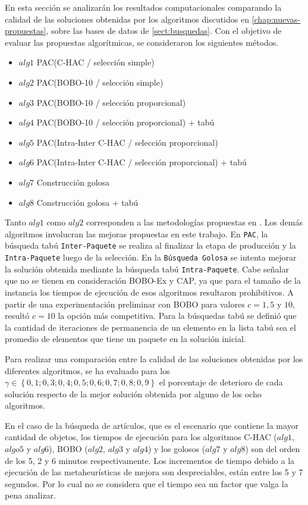 En esta sección se analizarán los resultados computacionales comparando la calidad de las soluciones obtenidas por los algoritmos discutidos en \autoref{chap:nuevas-propuestas}, sobre las bases de datos de \autoref{sect:busquedas}. Con el objetivo de evaluar las propuestas algorítmicas, se consideraron los siguientes métodos.

\begin{itemize}
\item{$alg1$} PAC(C-HAC / selección simple)
\item{$alg2$} PAC(BOBO-10 / selección simple)
\item{$alg3$} PAC(BOBO-10 / selección proporcional)
\item{$alg4$} PAC(BOBO-10 / selección proporcional) + tabú
\item{$alg5$} PAC(Intra-Inter C-HAC / selección proporcional)
\item{$alg6$} PAC(Intra-Inter C-HAC / selección proporcional) + tabú
\item{$alg7$} Construcción golosa
\item{$alg8$} Construcción golosa + tabú
\end{itemize}

Tanto $alg1$ como $alg2$ corresponden a las metodologías propuestas en \cite{journals/tkde/Amer-YahiaBCFMZ14}. Los demás algoritmos involucran las mejoras propuestas en este trabajo. En \texttt{PAC}, la búsqueda tabú \texttt{Inter-Paquete} se realiza al finalizar la etapa de producción y la \texttt{Intra-Paquete} luego de la selección. En la \texttt{Búsqueda Golosa} se intenta mejorar la solución obtenida mediante la búsqueda tabú \texttt{Intra-Paquete}. Cabe señalar que no se tienen en consideración BOBO-Ex y CAP, ya que para el tamaño de la instancia los tiempos de ejecución de esos algoritmos resultaron prohibitivos. A partir de una experimentación preliminar con BOBO para valores $c=1, 5$ y $10$, resultó $c=10$ la opción más competitiva. Para la búsquedas tabú se definió que la cantidad de iteraciones de permanencia de un elemento en la lista tabú sea el promedio de elementos que tiene un paquete en la solución inicial.

Para realizar una comparación entre la calidad de las soluciones obtenidas por los diferentes algoritmos, se ha evaluado para los $\gamma \in \left\{0,1; 0,3; 0,4; 0,5; 0,6; 0,7; 0,8; 0,9\right\}$ el porcentaje de deterioro de cada solución respecto de la mejor solución obtenida por alguno de los ocho algoritmos.

En el caso de la búsqueda de artículos, que es el escenario que contiene la mayor cantidad de objetos, los tiempos de ejecución para los algoritmos C-HAC ($alg1$, $algo5$ y $alg6$), BOBO ($alg2$, $alg3$ y $alg4$) y los golosos ($alg7$ y $alg8$) son del orden de los 5, 2 y 6 minutos respectivamente. Los incrementos de tiempo debido a la ejecución de las metaheurísticas de mejora son despreciables, están entre los 5 y 7 segundos. Por lo cual no se considera que el tiempo sea un factor que valga la pena analizar.

